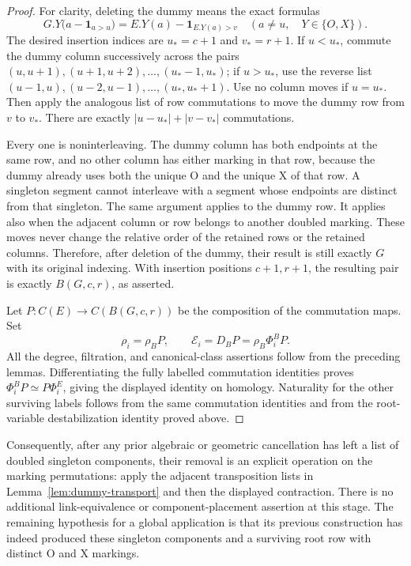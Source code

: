 \documentclass[11pt,a4paper]{article}
\theoremstyle{remark}
\begin{document}
\begin{proof}
For clarity, deleting the dummy means the exact formulas
\[
 G.Y\bigl(a-\mathbf1_{a>u}\bigr)
 =E.Y(a)-\mathbf1_{E.Y(a)>v}
 \quad(a\ne u,\quad Y\in\{O,X\}).
\]
The desired insertion indices are $u_*=c+1$ and $v_*=r+1$.
If $u<u_*$, commute the dummy column successively across the pairs
$(u,u+1),(u+1,u+2),\ldots,(u_*-1,u_*)$; if $u>u_*$, use the reverse
list $(u-1,u),(u-2,u-1),\ldots,(u_*,u_*+1)$.  Use no column moves if
$u=u_*$.  Then apply the analogous list of row commutations to move
the dummy row from $v$ to $v_*$.  There are exactly
$|u-u_*|+|v-v_*|$ commutations.

Every one is noninterleaving.  The dummy column has both endpoints at
the same row, and no other column has either marking in that row,
because the dummy already uses both the unique O and the unique X of
that row.  A singleton segment cannot interleave with a segment whose
endpoints are distinct from that singleton.  The same argument applies
to the dummy row.  It applies also when the adjacent column or row
belongs to another doubled marking.  These moves never change the
relative order of the retained rows or the retained columns.  Therefore,
after deletion of the dummy, their result is still exactly $G$ with its
original indexing.  With insertion positions $c+1,r+1$, the resulting
pair is exactly $B(G,c,r)$, as asserted.

Let $P:C(E)\to C(B(G,c,r))$ be the composition of the commutation maps.
Set
\[
 \rho_i=\rho_B P,
 \qquad
 \mathcal E_i=D_B P=\rho_B\Phi_i^B P.
\]
All the degree, filtration, and canonical-class assertions follow from
the preceding lemmas.  Differentiating the fully labelled commutation
identities proves $\Phi_i^B P\simeq P\Phi_i^E$, giving the displayed
identity on homology.  Naturality for the other surviving labels follows
from the same commutation identities and from the root-variable
destabilization identity proved above.
\end{proof}

Consequently, after any prior algebraic or geometric cancellation has
left a list of doubled singleton components, their removal is an
explicit operation on the marking permutations: apply the adjacent
transposition lists in Lemma~\ref{lem:dummy-transport} and then the
displayed contraction.  There is no additional link-equivalence or
component-placement assertion at this stage.  The remaining hypothesis
for a global application is that its previous construction has indeed
produced these singleton components and a surviving root row with
distinct O and X markings.
\end{document}
